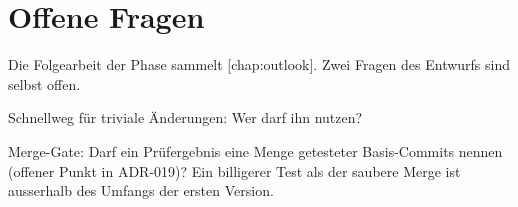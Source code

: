 \section[sec:phase4-open]{Offene Fragen}

Die Folgearbeit der Phase sammelt [chap:outlook].
Zwei Fragen des Entwurfs sind selbst offen.

\startitemize
\item Schnellweg für triviale Änderungen: Wer darf ihn nutzen?
\item Merge-Gate: Darf ein Prüfergebnis eine Menge getesteter Basis-Commits nennen
(offener Punkt in ADR-019)?
Ein billigerer Test als der saubere Merge ist ausserhalb des Umfangs der ersten Version.
\stopitemize
